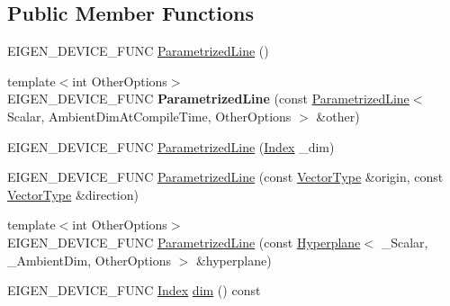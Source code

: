\subsection*{Public Member Functions}
\begin{DoxyCompactItemize}
\item 
E\+I\+G\+E\+N\+\_\+\+D\+E\+V\+I\+C\+E\+\_\+\+F\+U\+NC \mbox{\hyperlink{class_eigen_1_1_parametrized_line_a7c23f36d93cf3b3c2b37fd9f9eda5685}{Parametrized\+Line}} ()
\item 
\mbox{\label{class_eigen_1_1_parametrized_line_a2e2f479073705585b025de0db0af50d8}} 
{\footnotesize template$<$int Other\+Options$>$ }\\E\+I\+G\+E\+N\+\_\+\+D\+E\+V\+I\+C\+E\+\_\+\+F\+U\+NC {\bfseries Parametrized\+Line} (const \mbox{\hyperlink{class_eigen_1_1_parametrized_line}{Parametrized\+Line}}$<$ Scalar, Ambient\+Dim\+At\+Compile\+Time, Other\+Options $>$ \&other)
\item 
E\+I\+G\+E\+N\+\_\+\+D\+E\+V\+I\+C\+E\+\_\+\+F\+U\+NC \mbox{\hyperlink{class_eigen_1_1_parametrized_line_ac4ba4fe484f3a3abf78edec8c60ea13a}{Parametrized\+Line}} (\mbox{\hyperlink{class_eigen_1_1_parametrized_line_a3c9f84dd8608940282b16652a296c764}{Index}} \+\_\+dim)
\item 
E\+I\+G\+E\+N\+\_\+\+D\+E\+V\+I\+C\+E\+\_\+\+F\+U\+NC \mbox{\hyperlink{class_eigen_1_1_parametrized_line_a1b1d3ff9dee6f252f14bc2d8f3f0bb02}{Parametrized\+Line}} (const \mbox{\hyperlink{class_eigen_1_1_matrix}{Vector\+Type}} \&origin, const \mbox{\hyperlink{class_eigen_1_1_matrix}{Vector\+Type}} \&direction)
\item 
{\footnotesize template$<$int Other\+Options$>$ }\\E\+I\+G\+E\+N\+\_\+\+D\+E\+V\+I\+C\+E\+\_\+\+F\+U\+NC \mbox{\hyperlink{class_eigen_1_1_parametrized_line_a6b4a0e4a98ea57f3a2b2d5669d24e909}{Parametrized\+Line}} (const \mbox{\hyperlink{class_eigen_1_1_hyperplane}{Hyperplane}}$<$ \+\_\+\+Scalar, \+\_\+\+Ambient\+Dim, Other\+Options $>$ \&hyperplane)
\item 
E\+I\+G\+E\+N\+\_\+\+D\+E\+V\+I\+C\+E\+\_\+\+F\+U\+NC \mbox{\hyperlink{class_eigen_1_1_parametrized_line_a3c9f84dd8608940282b16652a296c764}{Index}} \mbox{\hyperlink{class_eigen_1_1_parametrized_line_a2e8d1ca4d1570e456952b5e979e5171c}{dim}} () const
\item 
\mbox{\label{class_eigen_1_1_parametrized_line_a587330ad5af9902fdbc8d32a89810e37}} 

\end{DoxyCompactItemize}
